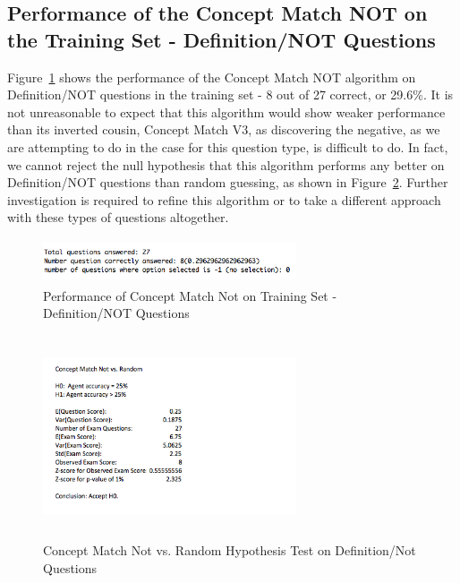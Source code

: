 \subsection{Performance of the Concept Match NOT on the Training Set - Definition/NOT Questions}

Figure~\ref{fig:concept_match_not_training_set_performance} shows the performance of the Concept Match NOT algorithm on Definition/NOT questions in the training set - 8 out of 27 correct, or 29.6\%.  It is not unreasonable to expect that this algorithm would show weaker performance than its inverted cousin, Concept Match V3, as discovering the negative, as we are attempting to do in the case for this question type, is difficult to do.  In fact, we cannot reject the null hypothesis that this algorithm performs any better on Definition/NOT questions than random guessing, as shown in Figure~\ref{fig:concept_match_not_hypothesis_test}.  Further investigation is required to refine this algorithm or to take a different approach with these types of questions altogether.



\begin{figure}
\centering
\vspace{0.75in}
\includegraphics[width=75mm, height=13mm]{concept_match_not_training_set_performance.png}
\caption{Performance of Concept Match Not on Training Set - Definition/NOT Questions}
\label{fig:concept_match_not_training_set_performance}
\end{figure}

\begin{figure}
\centering
\vspace{0.75in}
\includegraphics[width=75mm, height=60mm]{concept_match_not_hypothesis_test.png}
\caption{Concept Match Not vs. Random Hypothesis Test on Definition/Not Questions}
\label{fig:concept_match_not_hypothesis_test}
\end{figure}




